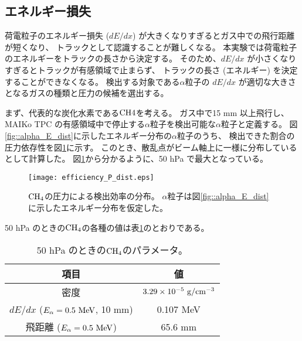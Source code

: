 \documentclass[../master]{subfiles}
\begin{document}
\subsection{エネルギー損失}
荷電粒子のエネルギー損失 ($dE/dx$) が大きくなりすぎるとガス中での飛行距離が短くなり、
トラックとして認識することが難しくなる。
本実験では荷電粒子のエネルギーをトラックの長さから決定する。
そのため、$dE/dx$ が小さくなりすぎるとトラックが有感領域で止まらず、
トラックの長さ (エネルギー) を決定することができなくなる。
検出する対象である$\alpha$粒子の $dE/dx$ が適切な大きさとなるガスの種類と圧力の候補を選出する。

まず、代表的な炭化水素である${\rm CH{4}}$を考える。
ガス中で15 mm 以上飛行し、MAIKo TPC の有感領域中で停止する$\alpha$粒子を検出可能な$\alpha$粒子と定義する。
図\ref{fig::alpha_E_dist}に示したエネルギー分布の$\alpha$粒子のうち、
検出できた割合の圧力依存性を図\ref{fig::efficiency_P_dist}に示す。
このとき、散乱点がビーム軸上に一様に分布しているとして計算した。
図\ref{fig::efficiency_P_dist}から分かるように、50 hPa で最大となっている。
\begin{figure}
  \centering
  \texttt{[image: efficiency\_P\_dist.eps]}
  \caption[${\rm CH_{4}}$の圧力による検出効率の分布。]
          {${\rm CH_{4}}$の圧力による検出効率の分布。
            $\alpha$粒子は図\ref{fig::alpha_E_dist}に示したエネルギー分布を仮定した。
           }
  \label{fig::efficiency_P_dist}
\end{figure}
50 hPa のときの${\rm CH_{4}}$の各種の値は表\ref{tab::CH4_50_params}のとおりである。
\begin{table}
  \centering
  \caption{50 hPa のときの${\rm CH_{4}}$のパラメータ。}
  \label{tab::CH4_50_params}
  \begin{tabular}{cc}
    \toprule
    項目 & 値\\
    \midrule
    密度 & $3.29\times10^{-5}~{\rm g/cm^{-3}}$\\
    $dE/dx$ ($E_{\alpha} = 0.5~{\rm MeV}$, 10 mm) & 0.107 MeV\\
    飛距離 ($E_{\alpha} = 0.5~{\rm MeV}$) & 65.6 mm \\
    \bottomrule
  \end{tabular}
\end{table}
\end{document}
